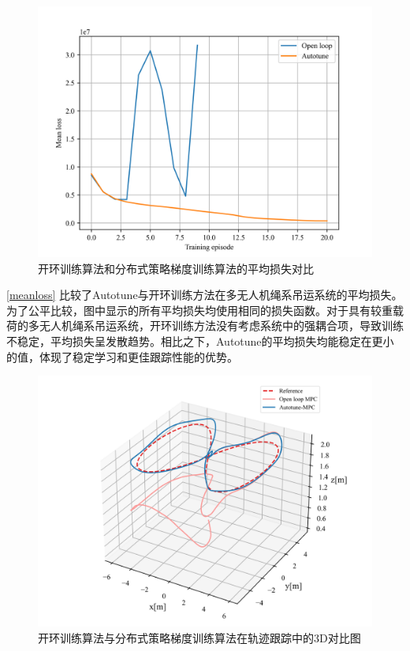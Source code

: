 \documentclass[lang=chs, degree=master, blindreview=true, winfonts=true]{yanputhesis}
\begin{document}
\begin{figure}[hbt!]
	\centering
	\includegraphics[width=30pc]{picture/kk/Mean_loss_cln.png} 
	\caption{开环训练算法和分布式策略梯度训练算法的平均损失对比} 
	\label{meanloss}
\end{figure}
\autoref{meanloss} 比较了Autotune与开环训练方法在多无人机绳系吊运系统的平均损失。为了公平比较，图中显示的所有平均损失均使用相同的损失函数。对于具有较重载荷的多无人机绳系吊运系统，开环训练方法没有考虑系统中的强耦合项，导致训练不稳定，平均损失呈发散趋势。相比之下，Autotune的平均损失均能稳定在更小的值，体现了稳定学习和更佳跟踪性能的优势。
\begin{figure}[hbt!]
	\centering
	\includegraphics[width=36pc]{picture/kk/plot3D.png} 
	\caption{开环训练算法与分布式策略梯度训练算法在轨迹跟踪中的3D对比图} 
	\label{cjb}
\end{figure}
\end{document}
